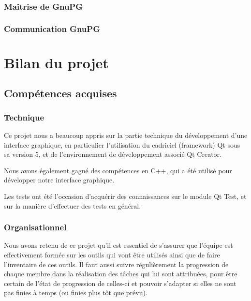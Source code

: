 \documentclass{../res/univ-projet}
\begin{document}
    \subsubsection{Maîtrise de GnuPG}
    
    \subsubsection{Communication GnuPG}
  

\section{Bilan du projet}
  
  \subsection{Compétences acquises}

    \subsubsection{Technique}
    
      Ce projet nous a beaucoup appris sur la partie technique du développement d'une interface graphique, en particulier l'utilisation du cadriciel (framework) Qt sous sa version 5, et de l'environnement de développement associé Qt Creator.

      Nous avons également gagné des compétences en C++, qui a été utilisé pour développer notre interface graphique.

      Les tests ont été l'occasion d'acquérir des connaissances sur le module Qt Test, et sur la manière d'effectuer des tests en général.



    \subsubsection{Organisationnel}

      Nous avons retenu de ce projet qu'il est essentiel de s'assurer que l'équipe est effectivement formée sur les outils qui vont être utilisés ainsi que de faire l'inventaire de ces outils.
      Il faut aussi suivre régulièrement la progression de chaque membre dans la réalisation des tâches qui lui sont attribuées, pour être certain de l'état de progression de celles-ci et pouvoir s'adapter si elles ne sont pas finies à temps (ou finies plus tôt que prévu).
\end{document}
